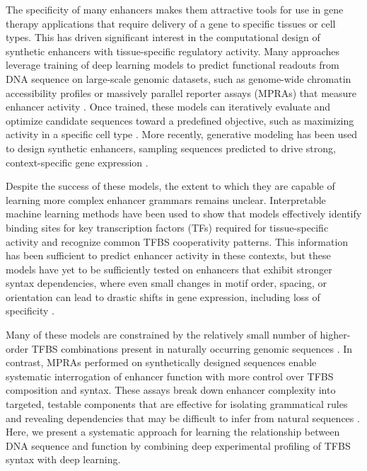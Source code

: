 The specificity of many enhancers makes them attractive tools for use in gene therapy applications that require delivery of a gene to specific tissues or cell types. This has driven significant interest in the computational design of synthetic enhancers with tissue-specific regulatory activity. Many approaches leverage training of deep learning models to predict functional readouts from DNA sequence on large-scale genomic datasets, such as genome-wide chromatin accessibility profiles \cite{Taskiran2023-xz,De_Almeida2023-xu} or massively parallel reporter assays (MPRAs) that measure enhancer activity \cite{De_Almeida2022-aa,Gosai2023-cw,De_Boer2020-mw,White2016-ks}. Once trained, these models can iteratively evaluate and optimize candidate sequences toward a predefined objective, such as maximizing activity in a specific cell type \cite{Gosai2023-cw,Taskiran2023-xz}. More recently, generative modeling has been used to design synthetic enhancers, sampling sequences predicted to drive strong, context-specific gene expression \cite{noauthor_undated-wu,Penzar2023-vr}.

Despite the success of these models, the extent to which they are capable of learning more  complex enhancer grammars remains unclear. Interpretable machine learning methods \cite{Novakovsky2022-ft} have been used to show that models effectively identify binding sites for key transcription factors (TFs) required for tissue-specific activity and recognize common TFBS cooperativity patterns\cite{Avsec2021-sw,De_Almeida2022-aa,Gosai2023-cw,Taskiran2023-xz}. This information has been sufficient to predict enhancer activity in these contexts, but these models have yet to be sufficiently tested on enhancers that exhibit stronger syntax dependencies, where even small changes in motif order, spacing, or orientation can lead to drastic shifts in gene expression, including loss of specificity \cite{Lim2024-ph,Jindal2022-qf,Farley2016-eh}. 

Many of these models are constrained by the relatively small number of higher-order TFBS combinations present in naturally occurring genomic sequences \cite{De_Boer2024-ic}. In contrast, MPRAs performed on synthetically designed sequences enable systematic interrogation of enhancer function with more control over TFBS composition and syntax. These assays break down enhancer complexity into targeted, testable components that are effective for isolating grammatical rules and revealing dependencies that may be difficult to infer from natural sequences \cite{Fromel2024-ux,King2020-hk}.
Here, we present a systematic approach for learning the relationship between DNA sequence and function by combining deep experimental profiling of TFBS syntax with deep learning. 

